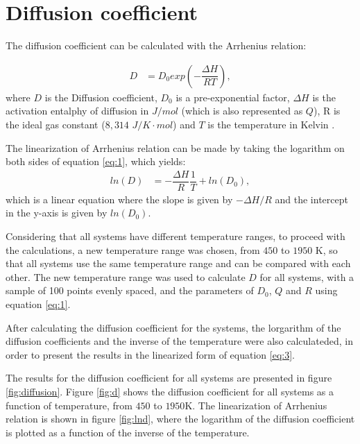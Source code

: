 \clearpage
\section{Diffusion coefficient}

The diffusion coefficient can be calculated with the Arrhenius relation:

\begin{align}
    \label{eq:1}
    D&=D_0 exp\left(-\dfrac{\Delta H}{RT}\right),
\end{align}
where $D$ is the Diffusion coefficient, $D_0$ is a pre-exponential factor, $\Delta H$ is the activation entalphy of diffusion in $J/mol$ (which is also represented as $Q$), R is the ideal gas constant ($8,314$ $J/K\cdot mol$) and $T$ is the temperature in Kelvin \citep{diff}. 

The linearization of Arrhenius relation can be made by taking the logarithm on both sides of equation \eqref{eq:1}, which yields:
\begin{align}
  \label{eq:2}
  ln(D)&=-\dfrac{\Delta H}{R}\dfrac{1}{T} + ln(D_0),
\end{align}
which is a linear equation where the slope is given by $-\Delta H/R$ and the intercept in the y-axis is given by $ln(D_0)$.

Considering that all systems have different temperature ranges, to proceed with the calculations, a new temperature range was chosen, from $450$ to $1950$ K, so that all systems use the same temperature range and can be compared with each other. The new temperature range was used to calculate $D$ for all systems, with a sample of 100 points evenly spaced, and the parameters of $D_0$, $Q$ and $R$ using equation \eqref{eq:1}.

After calculating the diffusion coefficient for the systems, the lorgarithm of the diffusion coefficients and the inverse of the temperature were also calculateded, in order to present the results in the linearized form of equation \eqref{eq:3}.

The results for the diffusion coefficient for all systems are presented in figure \ref{fig:diffusion}. Figure \ref{fig:d} shows the diffusion coefficient for all systems as a function of temperature, from $450$ to $1950$K. The linearization of Arrhenius relation is shown in figure \ref{fig:lnd}, where the logarithm of the diffusion coefficient is plotted as a function of the inverse of the temperature.

